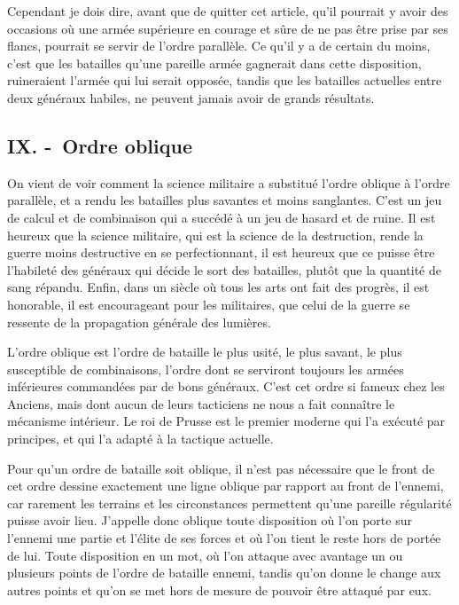 \documentclass[french,twoside]{book} %
\begin{document}
Cependant je dois dire, avant que de quitter cet article, qu’il pourrait y avoir des occasions où une armée supérieure en courage et sûre de ne pas être prise par ses flancs, pourrait se servir de l’ordre parallèle. Ce qu’il y a de certain du moins, c’est que les batailles qu’une pareille armée gagnerait dans cette disposition, ruineraient l’armée qui lui serait opposée, tandis que les batailles actuelles entre deux généraux habiles, ne peuvent jamais avoir de grands résultats.
\subsection[{IX. - Ordre oblique}]{IX. - Ordre oblique}
\noindent On vient de voir comment la science militaire a substitué l’ordre oblique à l’ordre parallèle, et a rendu les batailles plus savantes et moins sanglantes. C’est un jeu de calcul et de combinaison qui a succédé à un jeu de hasard et de ruine. Il est heureux que la science militaire, qui est la science de la destruction, rende la guerre moins destructive en se perfectionnant, il est heureux que ce puisse être l’habileté des généraux qui décide le sort des batailles, plutôt que la quantité de sang répandu. Enfin, dans un siècle où tous les arts ont fait des progrès, il est honorable, il est encourageant pour les militaires, que celui de la guerre se ressente de la propagation générale des lumières.\par
L’ordre oblique est l’ordre de bataille le plus usité, le plus savant, le plus susceptible de combinaisons, l’ordre dont se serviront toujours les armées inférieures commandées par de bons généraux. C’est cet ordre si fameux chez les Anciens, mais dont aucun de leurs tacticiens ne nous a fait connaître le mécanisme intérieur. Le roi de Prusse est le premier moderne qui l’a exécuté par principes, et qui l’a adapté à la tactique actuelle.\par
Pour qu’un ordre de bataille soit oblique, il n’est pas nécessaire que le front de cet ordre dessine exactement une ligne oblique par rapport au front de l’ennemi, car rarement les terrains et les circonstances permettent qu’une pareille régularité puisse avoir lieu. J’appelle donc oblique toute disposition où l’on porte sur l’ennemi une partie et l’élite de ses forces et où l’on tient le reste hors de portée de lui. Toute disposition en un mot, où l’on attaque avec avantage un ou plusieurs points de l’ordre de bataille ennemi, tandis qu’on donne le change aux autres points et qu’on se met hors de mesure de pouvoir être attaqué par eux.\par
\end{document}
